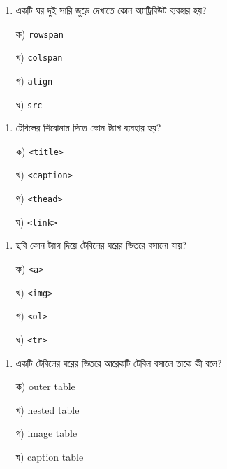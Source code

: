 \par
\par\addvspace{4pt}\noindent
\begin{minipage}[t]{.48\linewidth}\vspace{0pt}
\begin{enumerate}[start=9,leftmargin=*,topsep=0pt,itemsep=0pt]
\item একটি ঘর দুই সারি জুড়ে দেখাতে কোন অ্যাট্রিবিউট ব্যবহার হয়?
\par ক) \texttt{rowspan}
\par খ) \texttt{colspan}
\par গ) \texttt{align}
\par ঘ) \texttt{src}
\end{enumerate}
\end{minipage}\hfill
\begin{minipage}[t]{.48\linewidth}\vspace{0pt}
\begin{enumerate}[start=10,leftmargin=*,topsep=0pt,itemsep=0pt]
\item টেবিলের শিরোনাম দিতে কোন ট্যাগ ব্যবহার হয়?
\par ক) \texttt{<title>}
\par খ) \texttt{<caption>}
\par গ) \texttt{<thead>}
\par ঘ) \texttt{<link>}
\end{enumerate}
\end{minipage}
\par
\par\addvspace{4pt}\noindent
\begin{minipage}[t]{.48\linewidth}\vspace{0pt}
\begin{enumerate}[start=11,leftmargin=*,topsep=0pt,itemsep=0pt]
\item ছবি কোন ট্যাগ দিয়ে টেবিলের ঘরের ভিতরে বসানো যায়?
\par ক) \texttt{<a>}
\par খ) \texttt{<img>}
\par গ) \texttt{<ol>}
\par ঘ) \texttt{<tr>}
\end{enumerate}
\end{minipage}\hfill
\begin{minipage}[t]{.48\linewidth}\vspace{0pt}
\begin{enumerate}[start=12,leftmargin=*,topsep=0pt,itemsep=0pt]
\item একটি টেবিলের ঘরের ভিতরে আরেকটি টেবিল বসালে তাকে কী বলে?
\par ক) outer table
\par খ) nested table
\par গ) image table
\par ঘ) caption table
\end{enumerate}
\end{minipage}
\par

